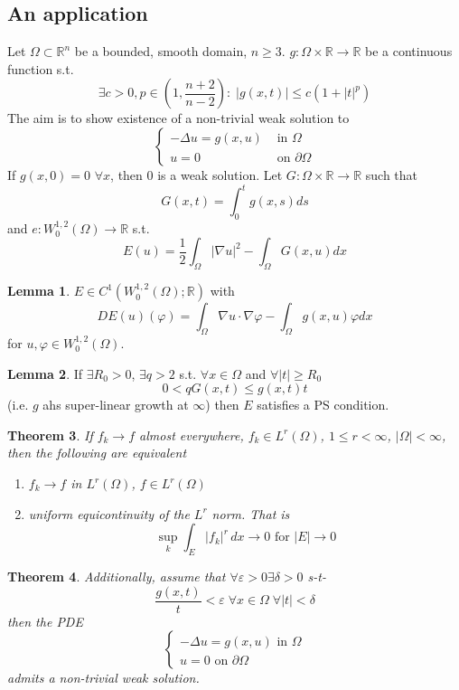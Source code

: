 \documentclass[a4paper, 12pt]{article}
\theoremstyle{plain}
\newtheorem{theorem}{Theorem}[section] %
\theoremstyle{definition}
\theoremstyle{lemma}
\newtheorem{lemma}[theorem]{Lemma}
\theoremstyle{remark}
\theoremstyle{corollary}
\theoremstyle{example}
\begin{document}
	\subsection{An application}
	Let $\Omega \subset \mathbb{R}^n$ be a bounded, smooth domain, $n \geq 3$. $g: \Omega \times \mathbb{R} \to \mathbb{R}$ be a continuous function s.t. \[\exists c > 0, p \in (1,\frac{n+2}{n-2}): \; \left|g(x,t)\right| \leq c (1+\left|t\right|^p)\]
	The aim is to show existence of a non-trivial weak solution to \[\begin{cases}
		-\Delta u = g(x,u) & \text{ in } \Omega\\
		u = 0 & \text{ on } \partial \Omega
	\end{cases}\]
	If $g(x,0) = 0$ $\forall x$, then 0 is a weak solution.
	Let $G: \Omega\times \mathbb{R} \to \mathbb{R}$ such that \[G(x,t) = \int_0^t g(x,s) ds\] and $e: W^{1,2}_0(\Omega) \to \mathbb{R}$ s.t. \[E(u) = \frac{1}{2}\int_\Omega \left|\nabla u\right|^2 - \int_\Omega G(x,u) dx\]
	\begin{lemma}
		$E \in C^1(W^{1,2}_0(\Omega);\mathbb{R})$ with \[DE(u)(\varphi) = \int_\Omega \nabla u \cdot \nabla \varphi - \int_\Omega g(x,u)\varphi dx\] for $u,\varphi \in W^{1,2}_0(\Omega)$.
	\end{lemma}
	\begin{lemma}
		If $\exists R_0 > 0$, $\exists q > 2$ s.t. $\forall x \in \Omega$ and $\forall \left|t\right| \geq R_0$ \[0 < q G(x,t) \leq g(x,t)t\] (i.e. $g$ ahs super-linear growth at $\infty$) then $E$ satisfies a PS condition.
	\end{lemma}
	\begin{theorem}
		If $f_k \to f$ almost everywhere, $f_k \in L^r(\Omega)$, $1 \leq r < \infty$, $\left|\Omega\right|<\infty$, then the following are equivalent
		\begin{enumerate}
			\item $f_k \to f$ in $L^r(\Omega)$, $f \in L^r(\Omega)$
			\item uniform equicontinuity of the $L^r$ norm. That is \[\sup_k \int_E \left|f_k\right|^r \, dx \to 0 \text{ for } \left|E\right| \to 0\]
		\end{enumerate}
	\end{theorem}
	\begin{theorem}
		Additionally, assume that $\forall \varepsilon>0 \exists \delta>0$ s-t- \[\frac{g(x,t)}{t} < \varepsilon \; \forall x \in \Omega \; \forall \left|t\right| < \delta\] then the PDE \[\begin{cases}
			- \Delta u = g(x,u) \text{ in } \Omega\\
			u = 0 \text{ on } \partial \Omega
		\end{cases}\] admits a non-trivial weak solution.
	\end{theorem}
\end{document}
